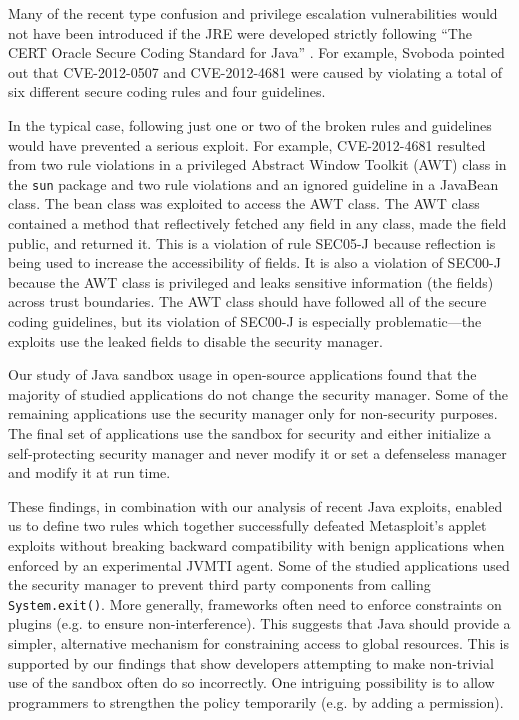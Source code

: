 \documentclass{sig-alternate}
\begin{document}
Many of the recent type confusion and privilege escalation vulnerabilities
would not have been introduced if the JRE were developed strictly
following ``The CERT Oracle Secure Coding Standard for Java'' \cite{long_cert_2011}.
For example, Svoboda \cite{svoboda_anatomy_blog_2013,svoboda_anatomy_2014}
pointed out that CVE-2012-0507 and CVE-2012-4681 were caused by violating
a total of six different secure coding rules and four guidelines. 

In the typical case, following just one or two of the broken rules
and guidelines would have prevented a serious exploit. For example,
CVE-2012-4681 resulted from two rule violations in a privileged Abstract
Window Toolkit (AWT) class in the \texttt{sun} package and two rule
violations and an ignored guideline in a JavaBean class. The bean
class was exploited to access the AWT class. The AWT class contained
a method that reflectively fetched any field in any class, made the
field public, and returned it. This is a violation of rule SEC05-J
because reflection is being used to increase the accessibility of
fields. It is also a violation of SEC00-J because the AWT class is
privileged and leaks sensitive information (the fields) across trust
boundaries. The AWT class should have followed all of the secure coding
guidelines, but its violation of SEC00-J is especially problematic---the
exploits use the leaked fields to disable the security manager. 


Our study of Java sandbox usage in open-source applications found
that the majority of studied applications do not change the security
manager. Some of the remaining applications use the security manager
only for non-security purposes. The final set of applications use
the sandbox for security and either initialize a self-protecting security
manager and never modify it or set a defenseless manager and modify
it at run time. 

These findings, in combination with our analysis of recent Java exploits,
enabled us to define two rules which together successfully
defeated Metasploit's applet exploits without breaking backward compatibility with benign applications when enforced by an experimental JVMTI agent. Some of the studied applications
used the security manager to prevent third party components from calling
\texttt{System.exit()}. More generally, frameworks often need to enforce
constraints on plugins (e.g. to ensure non-interference). This suggests
that Java should provide a simpler, alternative mechanism for constraining
access to global resources. This is supported by our findings that
show developers attempting to make non-trivial use of the sandbox
often do so incorrectly. One intriguing possibility is to allow programmers
to strengthen the policy temporarily (e.g. by adding a permission). 
\end{document}
